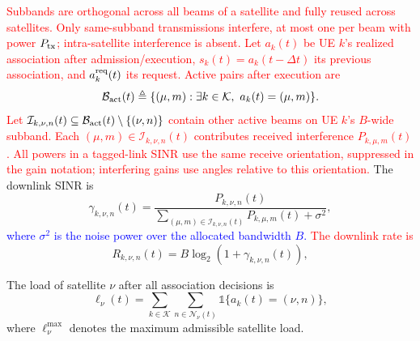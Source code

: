 \documentclass[10pt,letterpaper,journal]{IEEEtran}
\newcommand{\mathbbm}[1]{\mathds{#1}}
\newcommand{\revnew}[1]{\textcolor{red}{#1}}
\begin{document}
\textcolor{blue}{
\revnew{Subbands are orthogonal across all beams of a satellite and fully reused across satellites. Only same-subband transmissions interfere, at most one per beam with power $P_{\rm tx}$; intra-satellite interference is absent. Let $a_k(t)$ be UE $k$'s realized association after admission/execution, $s_k(t)=a_k(t-\Delta t)$ its previous association, and $a_k^{\rm req}(t)$ its request. Active pairs after execution are}}
\begin{equation}
\mathcal B_{\rm act}(t)
\triangleq
\{(\mu,m): \exists k\in\mathcal K,\ a_k(t)=(\mu,m)\}.
\end{equation}
\revnew{Let $\mathcal I_{k,\nu,n}(t)\subseteq \mathcal B_{\rm act}(t)\setminus\{(\nu,n)\}$ contain other active beams on UE $k$'s $B$-wide subband. Each $(\mu,m)\in\mathcal I_{k,\nu,n}(t)$ contributes received interference $P_{k,\mu,m}(t)$. All powers in a tagged-link SINR use the same receive orientation, suppressed in the gain notation; interfering gains use angles relative to this orientation.}
The downlink SINR is
\begin{equation}
\gamma_{k,\nu,n}(t)=
\frac{P_{k,\nu,n}(t)}
{\sum\limits_{(\mu,m)\in \mathcal{I}_{k,\nu,n}(t)} P_{k,\mu,m}(t) + \sigma^2},
\label{eq:sinr_sys_rev}
\end{equation}
\textcolor{blue}{where $\sigma^2$ is the noise power over the allocated bandwidth $B$.}
\revnew{The downlink rate is}
\begin{equation}
R_{k,\nu,n}(t) =
B \log_2 \left( 1 + \gamma_{k,\nu,n}(t) \right),
\label{eq:rate_def}
\end{equation}

The load of satellite $\nu$ after all association decisions is
\begin{equation}
\ell_\nu(t)=\sum_{k\in\mathcal{K}}\sum_{n\in\mathcal{N}_\nu(t)}\mathbbm{1}\{a_k(t)=(\nu,n)\},
\label{eq:load_sys_rev}
\end{equation}
where $\ell_\nu^{\max}$ denotes the maximum admissible satellite load.
\end{document}
